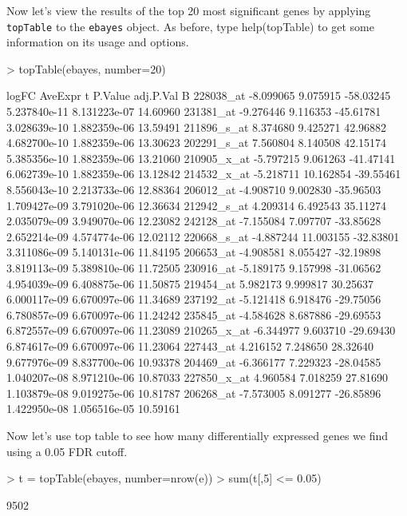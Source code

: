\documentclass[12pt]{article}
\newcommand{\code}[1]{{\texttt{#1}}}
\begin{document}
Now let's view the results of the top 20 most significant genes by applying \code{topTable} to the \code{ebayes} object.  As before, type help(topTable) to get some information on its usage and options.

\begin{Schunk}
\begin{Sinput}
> topTable(ebayes, number=20)
\end{Sinput}
\begin{Soutput}
                logFC   AveExpr         t      P.Value    adj.P.Val        B
228038_at   -8.099065  9.075915 -58.03245 5.237840e-11 8.131223e-07 14.60960
231381_at   -9.276446  9.116353 -45.61781 3.028639e-10 1.882359e-06 13.59491
211896_s_at  8.374680  9.425271  42.96882 4.682700e-10 1.882359e-06 13.30623
202291_s_at  7.560804  8.140508  42.15174 5.385356e-10 1.882359e-06 13.21060
210905_x_at -5.797215  9.061263 -41.47141 6.062739e-10 1.882359e-06 13.12842
214532_x_at -5.218711 10.162854 -39.55461 8.556043e-10 2.213733e-06 12.88364
206012_at   -4.908710  9.002830 -35.96503 1.709427e-09 3.791020e-06 12.36634
212942_s_at  4.209314  6.492543  35.11274 2.035079e-09 3.949070e-06 12.23082
242128_at   -7.155084  7.097707 -33.85628 2.652214e-09 4.574774e-06 12.02112
220668_s_at -4.887244 11.003155 -32.83801 3.311086e-09 5.140131e-06 11.84195
206653_at   -4.908581  8.055427 -32.19898 3.819113e-09 5.389810e-06 11.72505
230916_at   -5.189175  9.157998 -31.06562 4.954039e-09 6.408875e-06 11.50875
219454_at    5.982173  9.999817  30.25637 6.000117e-09 6.670097e-06 11.34689
237192_at   -5.121418  6.918476 -29.75056 6.780857e-09 6.670097e-06 11.24242
235845_at   -4.584628  8.687886 -29.69553 6.872557e-09 6.670097e-06 11.23089
210265_x_at -6.344977  9.603710 -29.69430 6.874617e-09 6.670097e-06 11.23064
227443_at    4.216152  7.248650  28.32640 9.677976e-09 8.837700e-06 10.93378
204469_at   -6.366177  7.229323 -28.04585 1.040207e-08 8.971210e-06 10.87033
227850_x_at  4.960584  7.018259  27.81690 1.103879e-08 9.019275e-06 10.81787
206268_at   -7.573005  8.091277 -26.85896 1.422950e-08 1.056516e-05 10.59161
\end{Soutput}
\end{Schunk}

Now let's use top table to see how many differentially expressed genes we find using a 0.05 FDR cutoff.

\begin{Schunk}
\begin{Sinput}
> t = topTable(ebayes, number=nrow(e))
> sum(t[,5] <= 0.05)
\end{Sinput}
\begin{Soutput}
[1] 9502
\end{Soutput}
\end{Schunk}
\end{document}
